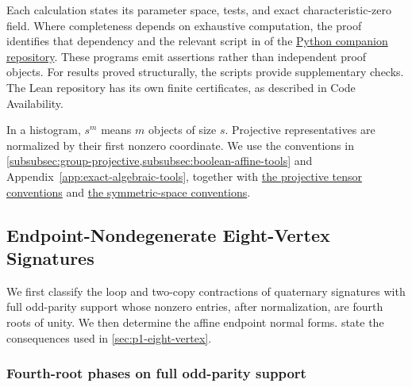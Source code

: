 \documentclass[11pt,letterpaper,onecolumn]{article}
\theoremstyle{plain}
\theoremstyle{definition}
\theoremstyle{remark}
\begin{document}
Each calculation states its parameter space, tests, and exact
characteristic-zero field. Where completeness depends on exhaustive
computation, the proof identifies that dependency and the relevant script
in  of the
\href{https://github.com/liuchliuch/Holant-X-Dichotomy}{Python companion repository}.
These programs emit assertions rather than independent proof objects.
For results proved structurally, the scripts provide supplementary checks.
The Lean repository has its own finite certificates, as described in Code Availability.

In a histogram, \(s^m\) means \(m\) objects of size \(s\).
Projective representatives are normalized by their first nonzero coordinate.
We use the conventions in
\cref{subsubsec:group-projective,subsubsec:boolean-affine-tools}
and Appendix~\ref{app:exact-algebraic-tools}, together with
\hyperref[subsubsec:projective-tensor-geometry]{the projective tensor conventions}
and \hyperref[subsubsec:symmetric-binary-spaces]{the symmetric-space conventions}.

\subsection{Endpoint-Nondegenerate Eight-Vertex Signatures}
\label{appsec:cert-eight-vertex}

We first classify the loop and two-copy contractions of quaternary
signatures with full odd-parity support whose nonzero entries, after
normalization, are fourth roots of unity. We then determine the affine
endpoint normal forms.
state the consequences used in \cref{sec:p1-eight-vertex}.

\subsubsection{Fourth-root phases on full odd-parity support}
\label{proofsubsec:cert-mu4}
\end{document}
